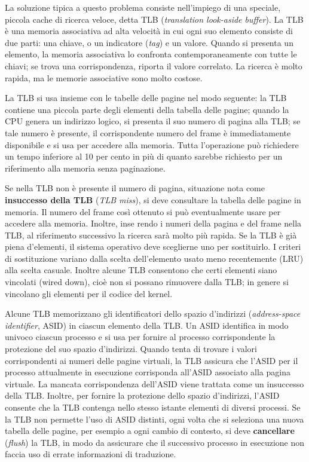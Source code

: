 \documentclass[11pt,a4paper]{article}
\begin{document}
La soluzione tipica a questo problema consiste nell'impiego di una speciale, piccola ca­che di ricerca veloce, detta TLB (\emph{translation look-aside buffer}). La TLB è una memoria asso­ciativa ad alta velocità in cui ogni suo elemento consiste di due parti: una chiave, o un indi­catore (\emph{tag}) e un valore. Quando si presenta un elemento, la memoria associativa lo confronta contemporaneamente con tutte le chiavi; se trova una corrispondenza, riporta il
valore correlato. La ricerca è molto rapida, ma le memorie associative sono molto costose.

La TLB si usa insieme con le tabelle delle pagine nel modo seguente: la TLB contiene
una piccola parte degli elementi della tabella delle pagine; quando la CPU genera un indiriz­zo logico, si presenta il suo numero di pagina alla TLB; se tale numero è presente, il corrispondente numero del frame è immediatamente disponibile e si usa per accedere alla me­moria. Tutta l'operazione può richiedere un tempo inferiore al 10 per cento in più di quanto sarebbe richiesto per un riferimento alla memoria senza paginazione.

Se nella TLB non è presente il numero di pagina, situazione nota come \textbf{insuccesso della TLB}
(\emph{TLB miss}), si deve consultare la tabella delle pagine in memoria. Il numero del frame così ot­tenuto si può eventualmente usare per accedere alla memoria. Inoltre, inse
rendo i numeri della pagina e del frame nella TLB, al riferimento successivo la ricerca sarà
molto più rapida. Se la TLB è già piena d'elementi, il sistema operativo deve sceglierne uno
per sostituirlo. I criteri di sostituzione variano dalla scelta dell'elemento usato meno recen­temente (LRU) alla scelta casuale. Inoltre alcune TLB consentono che certi elementi siano
vincolati (wired down), cioè non si possano rimuovere dalla TLB; in genere si vincolano gli
elementi per il codice del kernel.

Alcune TLB memorizzano gli identificatori dello spazio d'indirizzi (\emph{address-space
identifier}, ASID) in ciascun elemento della TLB. Un ASID identifica in modo univoco ciascun
processo e si usa per fornire al processo corrispondente la protezione del suo spazio d'indiriz­zi. Quando tenta di trovare i valori corrispondenti ai numeri delle pagine virtuali, la TLB as­sicura che l'ASID per il processo attualmente in esecuzione corrisponda all'ASID associato alla
pagina virtuale. La mancata corrispondenza dell'ASID viene trattata come un insuccesso della
TLB. Inoltre, per fornire la protezione dello spazio d'indirizzi, l'ASID consente che la TLB contenga nello stesso istante elementi di diversi processi. Se la TLB non permette l'uso di ASID di­stinti, ogni volta che si seleziona una nuova tabella delle pagine, per esempio a ogni cambio
di contesto, si deve \textbf{cancellare} (\emph{flush}) la TLB, in modo da assicurare che il successivo processo
in esecuzione non faccia uso di errate informazioni di traduzione.
\end{document}
